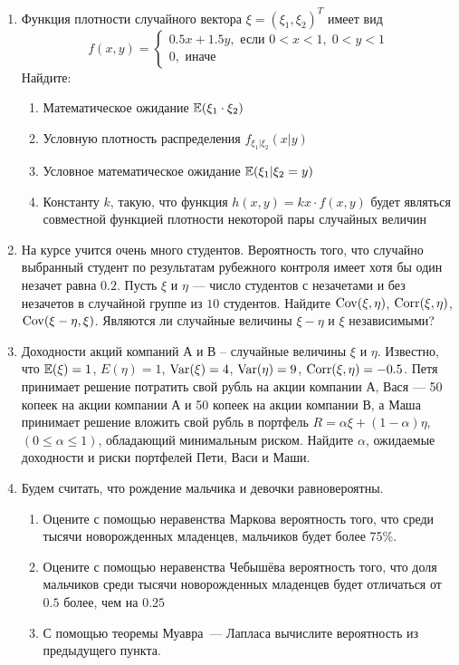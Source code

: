 \begin{enumerate}
\item Функция плотности случайного вектора $\xi=(\xi_1, \xi_2)^T$ имеет вид
\[
f(x,y)=\begin{cases}
0.5x + 1.5y, \text{ если } 0<x<1, \; 0<y<1 \\
0, \text{ иначе }
\end{cases}
\]
Найдите:
\begin{enumerate}
\item Математическое ожидание $\operatorname{\mathbb{E}}(\xi_1 \cdot \xi_2)$
\item Условную плотность распределения $f_{\xi_1|\xi_2} (x|y)$
\item Условное математическое ожидание $\operatorname{\mathbb{E}}(\xi_1| \xi_2=y)$
\item Константу $k$, такую, что функция $h(x,y)=kx\cdot f(x,y)$ будет являться
совместной функцией плотности некоторой пары случайных величин
\end{enumerate}

\item На курсе учится очень много студентов. Вероятность того, что случайно
выбранный студент по результатам рубежного контроля имеет хотя бы один незачет
равна $0.2$. Пусть $\xi$ и $\eta$ — число студентов с незачетами и без незачетов
в случайной группе из $10$ студентов. Найдите $\operatorname{Cov}(\xi,\eta)$, $\operatorname{Corr}(\xi,\eta)$,
$\operatorname{Cov}(\xi-\eta,\xi)$. Являются ли случайные величины $\xi-\eta$ и $\xi$ независимыми?

\item Доходности акций компаний А и В – случайные величины $\xi$ и $\eta$. Известно,
что $\operatorname{\mathbb{E}}(\xi)=1$, $E(\eta)=1$, $\operatorname{Var}(\xi)=4$, $\operatorname{Var}(\eta)=9$, $\operatorname{Corr}(\xi,\eta)=-0.5$.
Петя принимает решение потратить свой рубль на акции компании А, Вася — 50 копеек
на акции компании А и 50 копеек на акции компании В, а Маша  принимает решение
вложить свой рубль в портфель $R=\alpha\xi+(1-\alpha)\eta$, $(0 \leq \alpha \leq 1)$,
обладающий минимальным риском. Найдите $\alpha$, ожидаемые доходности и риски портфелей
Пети, Васи и Маши.

\item Будем считать, что рождение мальчика и девочки равновероятны.
\begin{enumerate}
\item Оцените с помощью неравенства Маркова вероятность того, что среди тысячи
новорожденных младенцев, мальчиков будет более 75\%.
\item Оцените с помощью неравенства Чебышёва вероятность того, что доля мальчиков
среди тысячи новорожденных младенцев будет отличаться от $0.5$ более, чем на $0.25$
\item С помощью теоремы Муавра~— Лапласа вычислите вероятность из предыдущего пункта.
\end{enumerate}


\end{enumerate}
